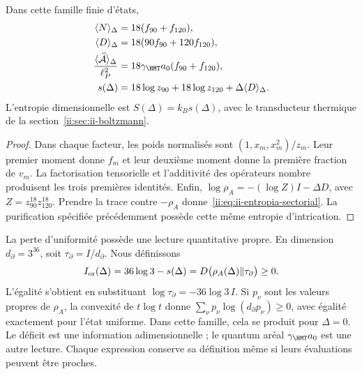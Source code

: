 \begin{proposition}
Dans cette famille finie d'états,
\begin{align}
 \langle N\rangle_\Delta&=18(f_{90}+f_{120}),\\
 \langle D\rangle_\Delta&=18(90f_{90}+120f_{120}),\\
 \frac{\langle\widehat{\mathcal A}\rangle_\Delta}{\ell_P^2}
 &=18\gamma_{\HMT}a_0(f_{90}+f_{120}),
 \label{ii:eq:ii-area-media}\\
 s(\Delta)&=18\log z_{90}+18\log z_{120}
                  +\Delta\langle D\rangle_\Delta.
 \label{ii:eq:ii-entropia-sectorial}
\end{align}
L'entropie dimensionnelle est $S(\Delta)=k_Bs(\Delta)$, avec le
transducteur thermique de la section~\ref{ii:sec:ii-boltzmann}.
\end{proposition}
\begin{proof}
Dans chaque facteur, les poids normalisés sont
$(1,x_m,x_m^2)/z_m$. Leur premier moment donne $f_m$ et leur deuxième
moment donne la première fraction de $v_m$. La factorisation tensorielle
et l'additivité des opérateurs nombre produisent les trois premières
identités. Enfin,
$\log\rho_A=-(\log Z)I-\Delta D$, avec
$Z=z_{90}^{18}z_{120}^{18}$. Prendre la trace contre $-\rho_A$
donne~\eqref{ii:eq:ii-entropia-sectorial}. La purification spécifiée
précédemment possède cette même entropie d'intrication.
\end{proof}

La perte d'uniformité possède une lecture quantitative propre.
En dimension \(d_\partial=3^{36}\), soit
\(\tau_\partial=I/d_\partial\). Nous définissons
\begin{equation}
 I_{\rm or}(\Delta)=36\log3-s(\Delta)
 =D\bigl(\rho_A(\Delta)\Vert\tau_\partial\bigr)\ge0.
 \label{ii:eq:ii-area-deficit-informacional}
\end{equation}
L'égalité s'obtient en substituant
\(\log\tau_\partial=-36\log3\,I\). Si \(p_\nu\) sont les
valeurs propres de \(\rho_A\), la convexité de \(t\log t\) donne
\(\sum_\nu p_\nu\log(d_\partial p_\nu)\ge0\), avec égalité
exactement pour l'état uniforme. Dans cette famille, cela se produit pour
\(\Delta=0\). Le déficit est une information adimensionnelle ; le quantum
aréal \(\gamma_{\HMT}a_0\) est une autre lecture. Chaque expression conserve
sa définition même si leurs évaluations peuvent être proches.

